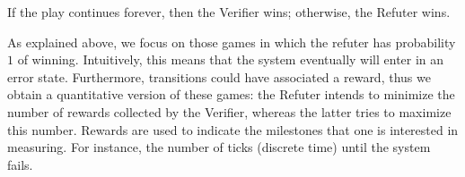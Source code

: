 %
If the play continues forever, then the Verifier wins; otherwise, the
Refuter wins. %

As explained above, we focus on those games
in which the refuter has probability $1$ of winning. Intuitively, this means that the system eventually will enter in an error state.  Furthermore, transitions could have associated a reward,  thus we obtain a quantitative version of these games: the Refuter intends to minimize the number of rewards collected by the Verifier, whereas the latter tries to maximize this number. Rewards are used to indicate the milestones that one  is interested in measuring. For instance, the number of ticks (discrete time) until the system fails.
\fi
